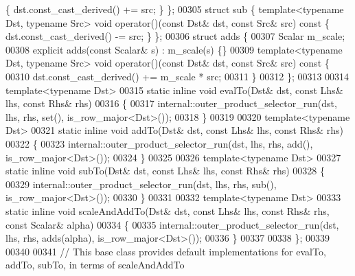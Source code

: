 \begin{DoxyCode}
      \{ dst.const\_cast\_derived() += src; \} \};
00305   \textcolor{keyword}{struct }sub  \{ \textcolor{keyword}{template}<\textcolor{keyword}{typename} Dst, \textcolor{keyword}{typename} Src> \textcolor{keywordtype}{void} operator()(\textcolor{keyword}{const} Dst& dst, \textcolor{keyword}{const} Src& src)\textcolor{keyword}{ const }
      \{ dst.const\_cast\_derived() -= src; \} \};
00306   \textcolor{keyword}{struct }adds \{
00307     Scalar m\_scale;
00308     \textcolor{keyword}{explicit} adds(\textcolor{keyword}{const} Scalar& s) : m\_scale(s) \{\}
00309     \textcolor{keyword}{template}<\textcolor{keyword}{typename} Dst, \textcolor{keyword}{typename} Src> \textcolor{keywordtype}{void} operator()(\textcolor{keyword}{const} Dst& dst, \textcolor{keyword}{const} Src& src)\textcolor{keyword}{ const }\{
00310       dst.const\_cast\_derived() += m\_scale * src;
00311     \}
00312   \};
00313   
00314   \textcolor{keyword}{template}<\textcolor{keyword}{typename} Dst>
00315   \textcolor{keyword}{static} \textcolor{keyword}{inline} \textcolor{keywordtype}{void} evalTo(Dst& dst, \textcolor{keyword}{const} Lhs& lhs, \textcolor{keyword}{const} Rhs& rhs)
00316   \{
00317     internal::outer\_product\_selector\_run(dst, lhs, rhs, \textcolor{keyword}{set}(), is\_row\_major<Dst>());
00318   \}
00319   
00320   \textcolor{keyword}{template}<\textcolor{keyword}{typename} Dst>
00321   \textcolor{keyword}{static} \textcolor{keyword}{inline} \textcolor{keywordtype}{void} addTo(Dst& dst, \textcolor{keyword}{const} Lhs& lhs, \textcolor{keyword}{const} Rhs& rhs)
00322   \{
00323     internal::outer\_product\_selector\_run(dst, lhs, rhs, add(), is\_row\_major<Dst>());
00324   \}
00325   
00326   \textcolor{keyword}{template}<\textcolor{keyword}{typename} Dst>
00327   \textcolor{keyword}{static} \textcolor{keyword}{inline} \textcolor{keywordtype}{void} subTo(Dst& dst, \textcolor{keyword}{const} Lhs& lhs, \textcolor{keyword}{const} Rhs& rhs)
00328   \{
00329     internal::outer\_product\_selector\_run(dst, lhs, rhs, sub(), is\_row\_major<Dst>());
00330   \}
00331   
00332   \textcolor{keyword}{template}<\textcolor{keyword}{typename} Dst>
00333   \textcolor{keyword}{static} \textcolor{keyword}{inline} \textcolor{keywordtype}{void} scaleAndAddTo(Dst& dst, \textcolor{keyword}{const} Lhs& lhs, \textcolor{keyword}{const} Rhs& rhs, \textcolor{keyword}{const} Scalar& alpha)
00334   \{
00335     internal::outer\_product\_selector\_run(dst, lhs, rhs, adds(alpha), is\_row\_major<Dst>());
00336   \}
00337   
00338 \};
00339 
00340 
00341 \textcolor{comment}{// This base class provides default implementations for evalTo, addTo, subTo, in terms of scaleAndAddTo}

\end{DoxyCode}
